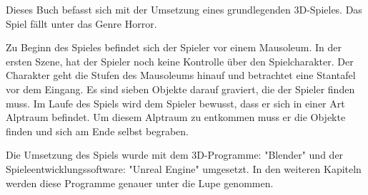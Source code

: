 Dieses Buch befasst sich mit der Umsetzung eines grundlegenden 3D-Spieles.
Das Spiel fällt unter das Genre Horror.

Zu Beginn des Spieles befindet sich der Spieler vor einem Mausoleum.
In der ersten Szene, hat der Spieler noch keine Kontrolle über den Spielcharakter.
Der Charakter geht die Stufen des Mausoleums hinauf und betrachtet eine Stantafel vor dem Eingang.
Es sind sieben Objekte darauf graviert, die der Spieler finden muss.
Im Laufe des Spiels wird dem Spieler bewusst, dass er sich in einer Art Alptraum befindet.
Um diesem Alptraum zu entkommen muss er die Objekte finden und sich am Ende selbst begraben.

Die Umsetzung des Spiels wurde mit dem 3D-Programme: "Blender" und der Spieleentwicklungssoftware: "Unreal Engine" umgesetzt.
In den weiteren Kapiteln werden diese Programme genauer unter die Lupe genommen.